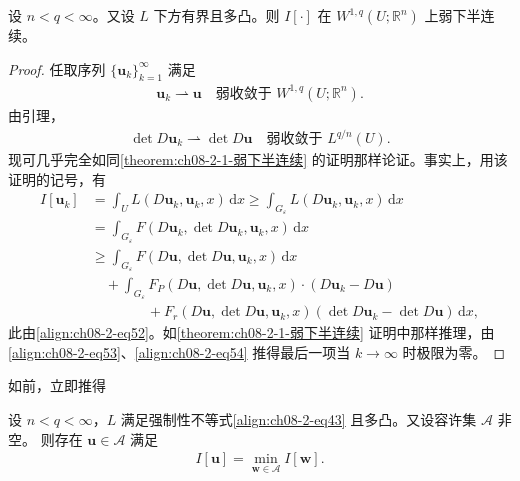 \documentclass[../../main.tex]{subfiles}
\begin{document}
\begin{theorem}[多凸泛函的下半连续性]\label{theorem:ch08-2-8-多凸下半连续}
设 $n<q<\infty$。又设 $L$ 下方有界且多凸。则 $I[\cdot]$ 在 $W^{1,q}(U;\mathbb{R}^n)$ 上弱下半连续。
\begin{proof}
任取序列 $\{\mathbf{u}_k\}_{k=1}^\infty$ 满足
\begin{align}
\mathbf{u}_k\rightharpoonup\mathbf{u}\quad\text{弱收敛于 }W^{1,q}(U;\mathbb{R}^n).\label{align:ch08-2-eq53}
\end{align}
由引理，
\begin{align}
\det D\mathbf{u}_k\rightharpoonup\det D\mathbf{u}\quad\text{弱收敛于 }L^{q/n}(U).\label{align:ch08-2-eq54}
\end{align}
现可几乎完全如同\cref{theorem:ch08-2-1-弱下半连续} 的证明那样论证。事实上，用该证明的记号，有
\begin{align*}
I[\mathbf{u}_k]&=\int_U L(D\mathbf{u}_k,\mathbf{u}_k,x)\,\mathrm{d}x\geqslant\int_{G_\varepsilon}L(D\mathbf{u}_k,\mathbf{u}_k,x)\,\mathrm{d}x\\
&=\int_{G_\varepsilon}F(D\mathbf{u}_k,\det D\mathbf{u}_k,\mathbf{u}_k,x)\,\mathrm{d}x\\
&\geqslant\int_{G_\varepsilon}F(D\mathbf{u},\det D\mathbf{u},\mathbf{u}_k,x)\,\mathrm{d}x\\
&\quad+\int_{G_\varepsilon}F_P(D\mathbf{u},\det D\mathbf{u},\mathbf{u}_k,x)\cdot(D\mathbf{u}_k-D\mathbf{u})\\
&\qquad\qquad+F_r(D\mathbf{u},\det D\mathbf{u},\mathbf{u}_k,x)(\det D\mathbf{u}_k-\det D\mathbf{u})\,\mathrm{d}x,
\end{align*}
此由\eqref{align:ch08-2-eq52}。如\cref{theorem:ch08-2-1-弱下半连续} 证明中那样推理，由\eqref{align:ch08-2-eq53}、\eqref{align:ch08-2-eq54} 推得最后一项当 $k\to\infty$ 时极限为零。
\end{proof}
\end{theorem}

如前，立即推得

\begin{theorem}[多凸泛函的极小元存在性]\label{theorem:ch08-2-9-多凸存在}
设 $n<q<\infty$，$L$ 满足强制性不等式\eqref{align:ch08-2-eq43} 且多凸。又设容许集 $\mathcal{A}$ 非空。
则存在 $\mathbf{u}\in\mathcal{A}$ 满足
\begin{align*}
I[\mathbf{u}]=\min_{\mathbf{w}\in\mathcal{A}}I[\mathbf{w}].
\end{align*}
\end{theorem}
\end{document}
